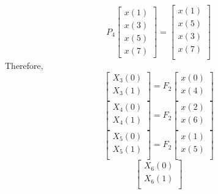 \documentclass[journal,12pt,twocolumn]{IEEEtran}
\renewcommand\thesection{\arabic{section}}
\begin{document}
\begin{enumerate}[label=\thesection.\arabic*.,ref=\thesection.\theenumi]
\begin{equation}
	P_{4}
	\begin{bmatrix}
		x(1) \\ 
		x(3) \\ 
		x(5) \\
		x(7)
	\end{bmatrix}
	= 
	\begin{bmatrix}
		x(1) \\ 
		x(5) \\ 
		x(3) \\ 
		x(7) \\
	\end{bmatrix}
\end{equation}
Therefore,
\begin{equation}
	\begin{bmatrix}
		X_{3}(0) \\ 
		X_{3}(1)\\ 
	\end{bmatrix}
	= F_{2}
	\begin{bmatrix}
		x(0) \\ 
		x(4) \\ 
	\end{bmatrix}
\end{equation}
\begin{equation}
	\begin{bmatrix}
		X_{4}(0) \\ 
		X_{4}(1)\\ 
	\end{bmatrix}
= F_{2}
\begin{bmatrix}
x(2) \\ 
x(6) \\ 
\end{bmatrix}
\end{equation}
\begin{equation}
\begin{bmatrix}
X_{5}(0) \\ 
X_{5}(1)\\ 
\end{bmatrix}
= F_{2}
\begin{bmatrix}
x(1) \\ 
x(5) \\ 
\end{bmatrix}
\end{equation}
\begin{equation}
\begin{bmatrix}
X_{6}(0) \\ 
X_{6}(1)\\ 
\end{bmatrix}

\end{equation}
\end{enumerate}
\end{document}
